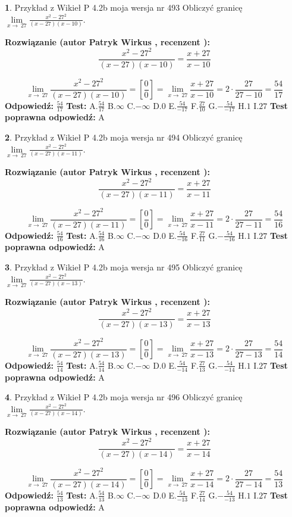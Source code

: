 \documentclass[12pt, a4paper]{article}
\theoremstyle{definition} %
\newtheorem{zad}{}
\newcommand{\zadStart}[1]{\begin{zad}#1\newline}
\newcommand{\zadStop}{\end{zad}}
\newcommand{\rozwStart}[2]{\noindent \textbf{Rozwiązanie (autor #1 , recenzent #2): }\newline}
\newcommand{\rozwStop}{\newline}
\newcommand{\odpStart}{\noindent \textbf{Odpowiedź:}\newline}
\newcommand{\odpStop}{\newline}
\newcommand{\testStart}{\noindent \textbf{Test:}\newline}
\newcommand{\testStop}{\newline}
\newcommand{\kluczStart}{\noindent \textbf{Test poprawna odpowiedź:}\newline}
\newcommand{\kluczStop}{\newline}
\begin{document}
\zadStart{Przykład z Wikieł P 4.2b moja wersja nr 493}
Obliczyć granicę $\lim\limits_{x\to\ 27}\frac{x^{2}-27^{2}}{(x-27)(x-10)}$.
\zadStop
\rozwStart{Patryk Wirkus}{}
$$\frac{x^{2}-27^{2}}{(x-27)(x-10)}=\frac{x+27}{x-10}$$

$$\lim\limits_{x\to\ 27}\frac{x^{2}-27^{2}}{(x-27)(x-10)}=[\frac{0}{0}]=\lim\limits_{x\to\ 27}\frac{x+27}{x-10}=2 \cdot \frac{27}{27-10} = \frac{54}{17}$$
\rozwStop
\odpStart
$\frac{54}{17}$
\odpStop
\testStart
A.$\frac{54}{17}$
B.$\infty$
C.$-\infty$
D.$0$
E.$\frac{54}{-17}$
F.$\frac{27}{10}$
G.$-\frac{54}{-17}$
H.$1$
I.$27$
\testStop
\kluczStart
A
\kluczStop



\zadStart{Przykład z Wikieł P 4.2b moja wersja nr 494}
Obliczyć granicę $\lim\limits_{x\to\ 27}\frac{x^{2}-27^{2}}{(x-27)(x-11)}$.
\zadStop
\rozwStart{Patryk Wirkus}{}
$$\frac{x^{2}-27^{2}}{(x-27)(x-11)}=\frac{x+27}{x-11}$$

$$\lim\limits_{x\to\ 27}\frac{x^{2}-27^{2}}{(x-27)(x-11)}=[\frac{0}{0}]=\lim\limits_{x\to\ 27}\frac{x+27}{x-11}=2 \cdot \frac{27}{27-11} = \frac{54}{16}$$
\rozwStop
\odpStart
$\frac{54}{16}$
\odpStop
\testStart
A.$\frac{54}{16}$
B.$\infty$
C.$-\infty$
D.$0$
E.$\frac{54}{-16}$
F.$\frac{27}{11}$
G.$-\frac{54}{-16}$
H.$1$
I.$27$
\testStop
\kluczStart
A
\kluczStop



\zadStart{Przykład z Wikieł P 4.2b moja wersja nr 495}
Obliczyć granicę $\lim\limits_{x\to\ 27}\frac{x^{2}-27^{2}}{(x-27)(x-13)}$.
\zadStop
\rozwStart{Patryk Wirkus}{}
$$\frac{x^{2}-27^{2}}{(x-27)(x-13)}=\frac{x+27}{x-13}$$

$$\lim\limits_{x\to\ 27}\frac{x^{2}-27^{2}}{(x-27)(x-13)}=[\frac{0}{0}]=\lim\limits_{x\to\ 27}\frac{x+27}{x-13}=2 \cdot \frac{27}{27-13} = \frac{54}{14}$$
\rozwStop
\odpStart
$\frac{54}{14}$
\odpStop
\testStart
A.$\frac{54}{14}$
B.$\infty$
C.$-\infty$
D.$0$
E.$\frac{54}{-14}$
F.$\frac{27}{13}$
G.$-\frac{54}{-14}$
H.$1$
I.$27$
\testStop
\kluczStart
A
\kluczStop



\zadStart{Przykład z Wikieł P 4.2b moja wersja nr 496}
Obliczyć granicę $\lim\limits_{x\to\ 27}\frac{x^{2}-27^{2}}{(x-27)(x-14)}$.
\zadStop
\rozwStart{Patryk Wirkus}{}
$$\frac{x^{2}-27^{2}}{(x-27)(x-14)}=\frac{x+27}{x-14}$$

$$\lim\limits_{x\to\ 27}\frac{x^{2}-27^{2}}{(x-27)(x-14)}=[\frac{0}{0}]=\lim\limits_{x\to\ 27}\frac{x+27}{x-14}=2 \cdot \frac{27}{27-14} = \frac{54}{13}$$
\rozwStop
\odpStart
$\frac{54}{13}$
\odpStop
\testStart
A.$\frac{54}{13}$
B.$\infty$
C.$-\infty$
D.$0$
E.$\frac{54}{-13}$
F.$\frac{27}{14}$
G.$-\frac{54}{-13}$
H.$1$
I.$27$
\testStop
\kluczStart
A
\kluczStop
\end{document}
